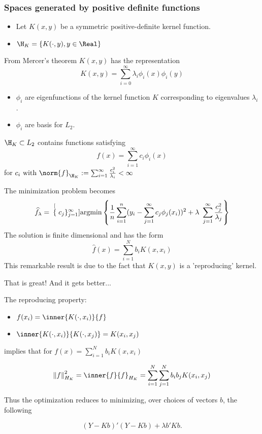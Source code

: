 \begin{frame}\frametitle{Spaces generated by positive definite functions}
\begin{itemize}
\item Let $K(x,y)$ be a symmetric positive-definite kernel function. 
\item $\H_K = \{K(\cdot, y), y \in \Real\}$
\end{itemize}
From Mercer's theorem $K(x,y)$ has the representation
\[K(x,y)=\sum_{i=0}^{\infty}\lambda_{i}\phi_{i}(x)\phi_{i}(y)\]
\begin{itemize}
\item $\phi_{i}$ are eigenfunctions of the kernel function $K$
corresponding to eigenvalues $\lambda_{i}$.
\item $\phi_{i}$ are basis for $L_2$.
\end{itemize}
$\H_{K}\subset L_{2}$ contains functions satisfying
\[f(x)=\sum_{i=1}^{\infty}c_{i}\phi_{i}(x)\] 
 for $c_{i} \mbox{ with  }\norm{f}_{\H_K}:= \sum_{i=1}^{\infty}\frac{{c_{i}^{2}}}{\lambda_{i}}<\infty$
\end{frame}

\begin{frame}
The minimization problem becomes
\begin{equation*}
\widehat{f}_{\lambda} = \hspace{.07in}\stackrel[\{c_j\}_{j=1}^{\infty}]{}{\mbox{argmin}} \left\{ \frac{1}{n}\sum_{i=1}^{n}(y_i - \sum_{j=1}^{\infty}c_j\phi_j(x_i))^2 + \lambda\ \sum_{j=1}^{\infty}\frac{c_j^2}{\lambda_j} \right\}
\label{eq:unpenalized objective function}
\end{equation*}
The solution is finite dimensional and has the form
\[
\hat{f}(x)=\sum_{i=1}^{N}b_{i}K(x,x_{i})
\]
This remarkable result is due to the fact that $K(x,y)$ is a 'reproducing' kernel. 

That is great! And it gets better...
\end{frame}
\begin{frame}
The reproducing property: 
\begin{itemize}
\item $f(x_i) = \inner{K(\cdot, x_i)}{f}$
\item $\inner{K(\cdot, x_i)}{K(\cdot, x_j)} = K(x_i, x_j)$
\end{itemize}
implies that for $f(x)=\sum_{i=1}^{N}b_{i}K(x,x_{i})$

\[\left\Vert f\right\Vert _{H_{K}}^{2}=\inner{f}{f}_{H_{K}}=\sum_{i=1}^{N}\sum_{j=1}^{N}b_{i}b_{j}K(x_{i},x_{j})\]

Thus the optimization reduces to minimizing, over choices of vectors $b$, the
following

\[(Y-Kb)'(Y-Kb)+\lambda b'Kb.\]
\end{frame}

